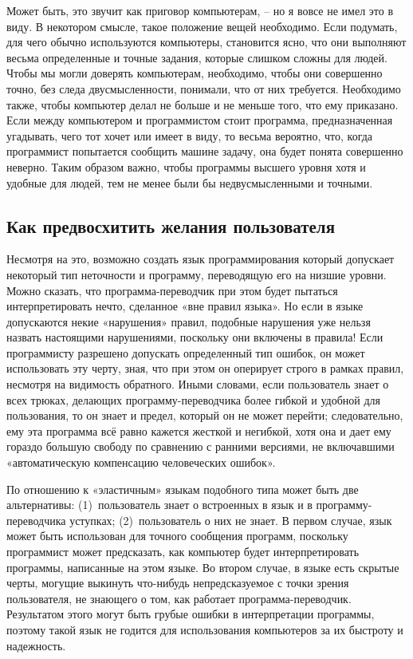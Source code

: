 \documentclass[../main.tex]{subfiles}
\begin{document}
Может быть, это звучит как приговор компьютерам, \--- но я вовсе не имел это в виду. В некотором смысле, такое положение вещей необходимо. Если подумать, для чего обычно используются компьютеры, становится ясно, что они выполняют весьма определенные и точные задания, которые слишком сложны для людей. Чтобы мы могли доверять компьютерам, необходимо, чтобы они совершенно точно, без следа двусмысленности, понимали, что от них требуется. Необходимо также, чтобы компьютер делал не больше и не меньше того, что ему приказано. Если между компьютером и программистом стоит программа, предназначенная угадывать, чего тот хочет или имеет в виду, то весьма вероятно, что, когда программист попытается сообщить машине задачу, она будет понята совершенно неверно. Таким образом важно, чтобы программы высшего уровня хотя и удобные для людей, тем не менее были бы недвусмысленными и точными.


\subsection{Как предвосхитить желания пользователя}

Несмотря на это, возможно создать язык программирования который допускает некоторый тип неточности и программу, переводящую его на низшие уровни. Можно сказать, что программа-переводчик при этом будет пытаться интерпретировать нечто, сделанное «вне правил языка». Но если в языке допускаются некие «нарушения» правил, подобные нарушения уже нельзя назвать настоящими нарушениями, поскольку они включены в правила! Если программисту разрешено допускать определенный тип ошибок, он может использовать эту черту, зная, что при этом он оперирует строго в рамках правил, несмотря на видимость обратного. Иными словами, если пользователь знает о всех трюках, делающих программу-переводчика более гибкой и удобной для пользования, то он знает и предел, который он не может перейти; следовательно, ему эта программа всё равно кажется жесткой и негибкой, хотя она и дает ему гораздо большую свободу по сравнению с ранними версиями, не включавшими «автоматическую компенсацию человеческих ошибок».

По отношению к «эластичным» языкам подобного типа может быть две альтернативы: (1)~пользователь знает о встроенных в язык и в программу-переводчика уступках; (2)~пользователь о них не знает. В первом случае, язык может быть использован для точного сообщения программ, поскольку программист может предсказать, как компьютер будет интерпретировать программы, написанные на этом языке. Во втором случае, в языке есть скрытые черты, могущие выкинуть что-нибудь непредсказуемое с точки зрения пользователя, не знающего о том, как работает программа-переводчик. Результатом этого могут быть грубые ошибки в интерпретации программы, поэтому такой язык не годится для использования компьютеров за их быстроту и надежность.
\end{document}
